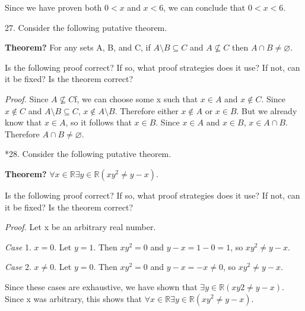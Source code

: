 \documentclass{article}
\begin{document}
Since we have proven both $0 < x$ and $x < 6$, we can conclude that $0 < x < 6$.

\vspace{30pt}



\vspace{30pt}

27. Consider the following putative theorem.

\textbf{Theorem?} For any sets A, B, and C, if $A \setminus B \subseteq C$ and $A \nsubseteq C$ then
$A \cap B \neq \varnothing$.

Is the following proof correct? If so, what proof strategies does it use?
If not, can it be fixed? Is the theorem correct?

\textit{Proof.} Since $A \nsubseteq C$f, we can choose some x such that $x \in A$ and $x \notin C$.
Since $x \notin C$ and $A \setminus B \subseteq C$, $x \notin A \setminus B$. Therefore either $x \notin A$ or
$x \in B$. But we already know that $x \in A$, so it follows that $x \in B$. Since
$x \in A$ and $x \in B$, $x \in A \cap B$. Therefore $A \cap B \neq \varnothing$.

\vspace{30pt}



\vspace{30pt}

*28. Consider the following putative theorem.

\textbf{Theorem?} $\forall x \in \mathbb{R} \exists y \in \mathbb{R}(x y^2 \neq y - x)$.

Is the following proof correct? If so, what proof strategies does it use?
If not, can it be fixed? Is the theorem correct?

\textit{Proof.} Let x be an arbitrary real number.

\textit{Case} 1. $x = 0$. Let $y = 1$. Then $x y^2 = 0$ and $y - x = 1 - 0 = 1$, so
$x y^2 \neq y - x$.

\textit{Case} 2. $x \neq 0$. Let $y = 0$. Then $x y^2 = 0$ and $y - x = -x \neq 0$, so
$x y^2 \neq y - x$.

Since these cases are exhaustive, we have shown that $\exists y \in \mathbb{R}(x y2 \neq
y - x)$. Since x was arbitrary, this shows that $\forall x \in \mathbb{R} \exists y \in \mathbb{R}(x y^2 \neq y - x)$.

\vspace{30pt}



\vspace{30pt}
\end{document}
